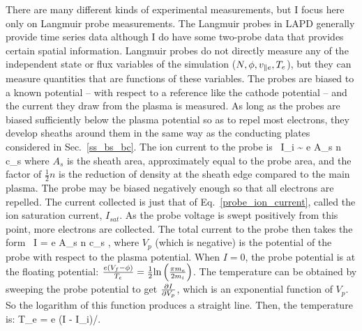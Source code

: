There are many different kinds of experimental measurements, but I focus here only on Langmuir probe measurements. The Langmuir probes in LAPD generally provide time series data although
I do have some two-probe data that provides certain spatial information. Langmuir probes do not directly measure any of the independent state or flux variables of the simulation 
($N, \phi, v_{\parallel e}, T_e$), but they can measure quantities that are functions of these variables. The probes are biased to a known potential -- with respect to a reference like the cathode potential --
and the current they draw from the plasma is measured. As long as the probes are biased sufficiently below the plasma potential so as to repel most electrons, 
they develop sheaths around them in the same way as the conducting plates considered in Sec.~\ref{ss_bs_bc}. The ion current to the probe is~\cite{hutchinson2002}
\beq
\label{probe_ion_current}
I_i \sim {} e A_s n c_s
\eeq
where $A_s$ is the sheath area, approximately equal to the probe area, and the factor of $\frac{1}{2} n$ is the reduction of density at the sheath edge compared to the main plasma.
The probe may be biased negatively enough so that all electrons are repelled. The current collected is just that of Eq.~\ref{probe_ion_current}, called the ion saturation current, $I_{sat}$.
As the probe voltage is swept positively from this point, more electrons are collected. The total current to the probe then takes the form~\cite{hutchinson2002}
\beq
\label{probe_current}
I = e A_s n c_s ,
\eeq
where $V_p$ (which is negative) is the potential of the probe with respect to the plasma potential. When $I=0$, the probe potential is at the floating potential: 
$\frac{e (V_f - \phi)}{T_e} = \frac{1}{2} {\rm ln} \left(\frac{\pi m_e}{2 m_i}\right)$. The temperature can be obtained by sweeping the probe potential to get $\frac{\partial I}{\partial V_p}$, 
which is an exponential function of $V_p$.
So the logarithm of this function produces a straight line. Then, the temperature is:
\beq
\label{probe_temp}
T_e = e (I - I_i)/.
\eeq

